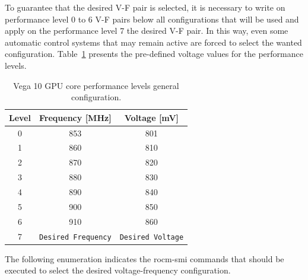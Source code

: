 To guarantee that the desired V-F pair is selected, it is necessary to write on performance level 0 to 6 V-F pairs below all configurations that will be used and apply on the performance level 7 the desired V-F pair. In this way, even some automatic control systems that may remain active are forced to select the wanted configuration. Table~\ref{tab:gpulevels-tuning} presents the pre-defined voltage values for the performance levels.

\begin{table}[!htb]
\centering
\begin{tabular}{ccc}
\textbf{Level} & \textbf{Frequency {[}MHz{]}} & \textbf{Voltage {[}mV{]}}  \\ \hline
0              & 853                          & 801                        \\
1              & 860                          & 810                      \\
2              & 870                          & 820                       \\
3              & 880                          & 830                      \\ 
4              & 890                          & 840                      \\
5              & 900                          & 850                     \\
6              & 910                          & 860                       \\
7              & \texttt{Desired Frequency}   & \texttt{Desired Voltage}                     \\ \hline
\end{tabular}
\caption{Vega 10 GPU core performance levels general configuration.}
\label{tab:gpulevels-tuning}
\end{table}

The following enumeration indicates the rocm-smi commands that should be executed to select the desired voltage-frequency configuration.

